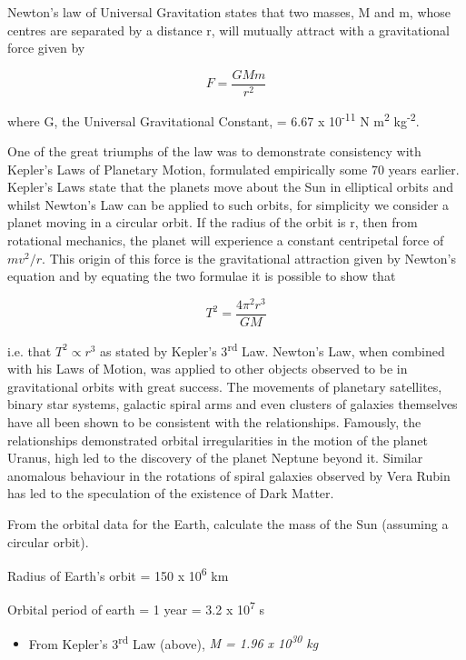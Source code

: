 \documentclass[revision-guide.tex]{subfiles}
\begin{document}
Newton's law of Universal Gravitation states that two masses, M and m,
whose centres are separated by a distance r, will mutually attract with
a gravitational force given by

\[F = \frac{G M m }{ r^{2}}\]

where G, the Universal Gravitational Constant, = 6.67 x
10\textsuperscript{-11} N m\textsuperscript{2} kg\textsuperscript{-2}.

One of the great triumphs of the law was to demonstrate consistency with
Kepler's Laws of Planetary Motion, formulated empirically some 70 years
earlier. Kepler's Laws state that the planets move about the Sun in
elliptical orbits and whilst Newton's Law can be applied to such orbits,
for simplicity we consider a planet moving in a circular orbit. If the
radius of the orbit is r, then from rotational mechanics, the planet
will experience a constant centripetal force of $mv^{2}/r$.
This origin of this force is the gravitational attraction given by
Newton's equation and by equating the two formulae it is possible to
show that

\begin{equation}
T^{2} = \frac{4 \pi^{2} r^{3}}{ G M}
\end{equation}

i.e. that $T^2 \propto r^3$ as stated by
Kepler's 3\textsuperscript{rd} Law. Newton's Law, when combined with his
Laws of Motion, was applied to other objects observed to be in
gravitational orbits with great success. The movements of planetary
satellites, binary star systems, galactic spiral arms and even clusters
of galaxies themselves have all been shown to be consistent with the
relationships. Famously, the relationships demonstrated orbital
irregularities in the motion of the planet Uranus, high led to the
discovery of the planet Neptune beyond it. Similar anomalous behaviour
in the rotations of spiral galaxies observed by Vera Rubin has led to
the speculation of the existence of Dark Matter.

\begin{example}

From the orbital data for the Earth, calculate the mass of the Sun
(assuming a circular orbit).

\answer

Radius of Earth's orbit = 150 x 10\textsuperscript{6} km

Orbital period of earth = 1 year = 3.2 x 10\textsuperscript{7} s

\begin{itemize}
\item
  From Kepler's 3\textsuperscript{rd} Law (above), \emph{M = 1.96 x
  10\textsuperscript{30} kg}
\end{itemize}

\end{example}
\end{document}

